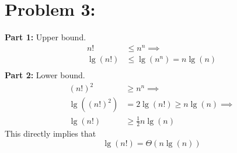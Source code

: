 \documentclass{article}
\begin{document}
\section*{Problem 3:}
\textbf{Part 1:} Upper bound.
\begin{align*}
    n! &\leq n^n \implies \\
    \lg(n!) &\leq \lg(n^n) = n \lg(n) \\
\end{align*}
\textbf{Part 2:} Lower bound.
\begin{align*}
    (n!)^2 &\geq n^n \implies \\
    \lg((n!)^2) &= 2 \lg(n!) \geq n \lg(n) \implies \\
    \lg(n!) &\geq \frac{1}{2} n \lg(n)
\end{align*}
This directly implies that
$$ \lg(n!) = \Theta(n \lg(n)) $$
\end{document}
